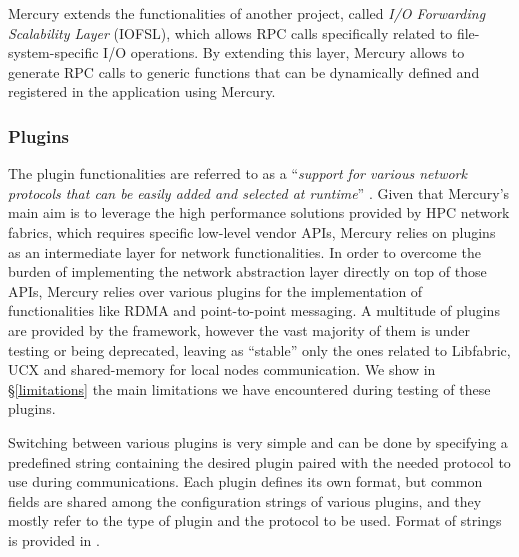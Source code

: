 Mercury extends the functionalities of another project, called \textit{I/O Forwarding Scalability Layer} (IOFSL)\cite{iofsl}, which allows RPC calls specifically related to file-system-specific I/O operations. By extending this layer, Mercury allows to generate RPC calls to generic functions that can be dynamically defined and registered in the application using Mercury.

\subsubsection{Plugins}
\label{plugins}
The plugin functionalities are referred to as a ``\textit{support for various network protocols that can be easily added and selected at runtime}'' \cite{nal_guide}.
Given that Mercury's main aim is to leverage the high performance solutions provided by HPC network fabrics, which requires specific low-level vendor APIs, Mercury relies on plugins as an intermediate layer for network functionalities. In order to overcome the burden of implementing the network abstraction layer directly on top of those APIs, Mercury relies over various plugins for the implementation of functionalities like RDMA and point-to-point messaging. A multitude of plugins are provided by the framework, however the vast majority of them is under testing or being deprecated, leaving as ``stable'' only the ones related to Libfabric, UCX and shared-memory \cite{sm_plugin} for local nodes communication. We show in \S\ref{limitations} the main limitations we have encountered during testing of these plugins.\newline

Switching between various plugins is very simple and can be done by specifying a predefined string containing the desired plugin paired with the needed protocol to use during communications. Each plugin defines its own format, but common fields are shared among the configuration strings of various plugins, and they mostly refer to the type of plugin and the protocol to be used. Format of strings is provided in .

